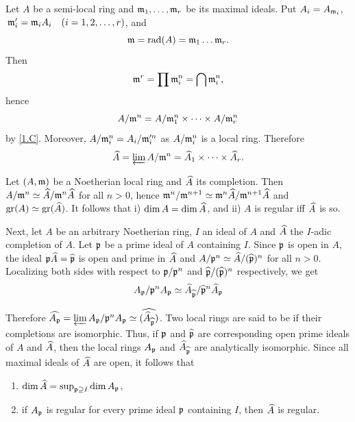 \documentclass[../main]{subfiles}
\begin{document}
\newparagraph Let $A$ be a semi-local ring and $\mathfrak{m}_1, \dots, \mathfrak{m}_r$ be its maximal ideals. Put $A_i = A_{\mathfrak{m}_i}$, $\,{\ideal m}_i' = {\ideal m}_i A_i\for{i = 1, 2, \ldots, r}$, and \[\mathfrak{m} = \operatorname{rad}(A) = \mathfrak{m}_1 \dots \mathfrak{m}_r.\] Then \[{\mathfrak{m}}^r = \prod \mathfrak{m}_i^n = \bigcap \mathfrak{m}_i^n,\] hence \[A/\mathfrak{m}^n = A/\mathfrak{m}_1^n \times \dots \times A/\mathfrak{m}_r^n\] by \ref{1.C}. Moreover, $A/\mathfrak{m}_i^n = A_i/\mathfrak{m}_i'^n$ as $A/\mathfrak{m}_i^n$ is a local ring. Therefore
\[
\widehat{A} = \varprojlim A/\mathfrak{m}^n = \widehat{A}_1 \times \dots \times \widehat{A}_r.
\]

\newparagraph Let $(A, \mathfrak{m})$ be a Noetherian local ring and $\widehat{A}$ its completion. Then $A/\mathfrak{m}^n \simeq \widehat{A}/\mathfrak{m}^n \widehat{A}$ for all $n > 0$, hence $\mathfrak{m}^n/\mathfrak{m}^{n + 1} \simeq \mathfrak{m}^n \widehat{A}/\mathfrak{m}^{n + 1} \widehat{A}$ and \newline $\operatorname{gr}(A) \simeq \operatorname{gr}(\widehat{A})$. It follows that i) $\operatorname{dim} A = \operatorname{dim} \widehat{A}$, and ii) $A$ is regular iff $\widehat{A}$ is so. 

Next, let $A$ be an arbitrary Noetherian ring, $I$ an ideal of $A$ and $\widehat{A}$ the $I$-adic completion of $A$. Let $\mathfrak{p}$ be a prime ideal of $A$ containing $I$. Since $\mathfrak{p}$ is open in $A$, the ideal $\mathfrak{p} \widehat{A} = \widehat{\mathfrak{p}}$ is open and prime in $\widehat{A}$ and $A/\mathfrak{p}^n \simeq \widehat{A}/(\widehat{\mathfrak{p}})^n$ for all $n > 0$. Localizing both sides with respect to $\mathfrak{p}/\mathfrak{p}^n$ and $\widehat{\mathfrak{p}}/(\widehat{\mathfrak{p}})^n$ respectively, we get
\[
A_{\mathfrak{p}}/\mathfrak{p}^n A_{\mathfrak{p}} \simeq {\widehat{A}}_{\widehat{\mathfrak{p}}}/{\widehat{\mathfrak{p}}}^n \widehat{A}_{\mathfrak{p}}
\]

Therefore $\widehat{A_{\mathfrak{p}}} = \varprojlim A_{\mathfrak{p}}/\mathfrak{p}^n A_{\mathfrak{p}} \simeq \widehat{({\widehat{A}}_{\widehat{\mathfrak{p}}})}$. Two local rings are said to be  if their completions are isomorphic. Thus, if $\mathfrak{p}$ and $\widehat{\mathfrak{p}}$ are corresponding open prime ideals of $A$ and $\widehat{A}$, then the local rings $A_{\mathfrak{p}}$ and ${\widehat{A}}_{\widehat{\mathfrak{p}}}$ are analytically isomorphic. Since all maximal ideals of $\widehat{A}$ are open, it follows that

\begin{enumerate}[label=\roman*')]
    \item $\operatorname{dim} \widehat{A} = \sup_{\mathfrak{p} \supseteq I} \operatorname{dim} A_{\mathfrak{p}}$,
    \item if $A_{\mathfrak{p}}$ is regular for every prime ideal $\mathfrak{p}$ containing $I$, then $\widehat{A}$ is regular.
\end{enumerate}
\end{document}
